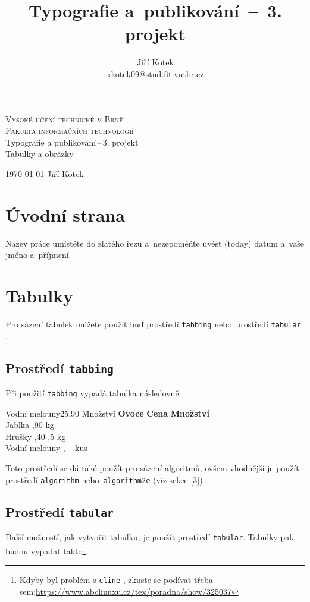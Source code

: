 \documentclass [11pt, a4paper] {article}
\title{Typografie a~publikování  \,--\, 3. projekt}
\author{Jiří Kotek \\ \href{mailto:xkotek09@stud.fit.vutbr.cz}{xkotek09@stud.fit.vutbr.cz}}
\date{}
\begin{document}
    
    \begin{titlepage}
        \begin{center}
        \Huge
        \textsc{Vysoké učení technické v Brně\\
        \huge
        {Fakulta informačních technologií}\\}
        \LARGE
        Typografie a publikování\,--\,3. projekt \\
        \Huge{Tabulky a obrázky}
        \end{center} 
        {\Large \today \hfill
        Jiří Kotek}
    \end{titlepage}

    \section{Úvodní strana}
        Název práce umístěte do zlatého řezu a~nezepoměňte uvést  (today) datum a~vaše jméno a~příjmení.
    \section{Tabulky}
        Pro sázení tabulek můžete použít buď prostředí \verb|tabbing| nebo~prostředí \verb|tabular| .
        \subsection{Prostředí \texttt{tabbing}}
            Při použití \verb|tabbing| vypadá tabulka následovně:

        
            \begin{tabbing}
                Vodní melouny\quad \= 25,90 \qquad \= Množství \kill
                \textbf{Ovoce} \>  \textbf{Cena} \> \textbf{Množství}\\
                Jablka ,90  kg\\
                Hrušky ,40 ,5 kg\\ 
                Vodní melouny ,\,--\,  kus\\ 
            \end{tabbing}
    
        
        Toto prostředí se dá také použít pro sázení algoritmů, ovšem vhodnější je použít prostředí \verb|algorithm| nebo~\verb|algorithm2e| (viz sekce \ref{3})

        \subsection{Prostředí \texttt{tabular}}
        Další možností, jak vytvořit tabulku, je použít prostředí \verb|tabular|. Tabulky pak budou vypadat takto\footnote [1] {Kdyby  byl problém s \verb+cline+ , zkuste se podívat třeba sem:{\href{https://www.abclinuxu.cz/tex/poradna/show/325037}{https://www.abclinuxu.cz/tex/poradna/show/325037}}}
\end{document}
